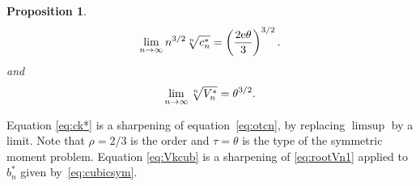 \documentclass[pdftex]{sigma}
\numberwithin{equation}{section}
\newtheorem{prop}[thm]{Proposition}
\begin{document}
\begin{prop}\label{thm:ck*}
\begin{gather}\label{eq:ck*}
\lim_{n\to\infty} n^{3/2}\root{n}\of{c_{n}^*}=\left(\frac{2{\rm e}\theta}{3} \right)^{3/2}.
\end{gather}
and
\begin{gather}\label{eq:Vkcub}
\lim_{n\to\infty} \root{n} \of{V_n^*}=\theta^{3/2}.
\end{gather}
\end{prop}

Equation \eqref{eq:ck*} is a sharpening of equation~\eqref{eq:otcn}, by replacing $\limsup$ by a limit. Note that $\rho=2/3$ is the order and $\tau=\theta$ is the type of the symmetric moment problem. Equation \eqref{eq:Vkcub} is a sharpening of \eqref{eq:rootVn1} applied to $b_n^{*}$ given by~\eqref{eq:cubicsym}.
\end{document}
